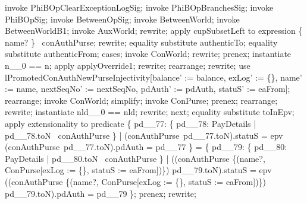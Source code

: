 \begin{LPScript}\begin{zproof}[lPromotedAuxWorldClearExceptionLogType]
    invoke PhiBOpClearExceptionLogSig;
    invoke PhiBOpBranchesSig;
    invoke PhiBOpSig;
    invoke BetweenOpSig;
    invoke BetweenWorld;
    invoke BetweenWorldB1;
    invoke AuxWorld;
    rewrite;
    apply cupSubsetLeft to expression \{ name? \} \cup \dom~conAuthPurse;
    rewrite;
    equality substitute authenticTo;
    equality substitute authenticFrom;
    cases;
        invoke ConWorld;
        rewrite;
        prenex;
        instantiate n\_\_0 == n;
        apply applyOverride1;
        rewrite;
        rearrange;
        rewrite;
        use lPromotedConAuthNewPurseInjectivity[balance' := balance,
            exLog' := \{\}, name' := name, nextSeqNo' := nextSeqNo,
            pdAuth' := pdAuth, statuS' := eaFrom];
        rearrange;
        invoke ConWorld;
        simplify;
        invoke ConPurse;
        prenex;
        rearrange;
        rewrite;
        instantiate nld\_\_0 == nld;
        rewrite;
    next;
        equality substitute toInEpv;
        apply extensionality to predicate
            \{ pd\_\_77: \{ pd\_\_78: PayDetails | pd\_\_78.toN \in \dom~conAuthPurse \}
              | (conAuthPurse~pd\_\_77.toN).statuS = epv
             \land (conAuthPurse~pd\_\_77.toN).pdAuth = pd\_\_77 \}
            = \{ pd\_\_79: \{ pd\_\_80: PayDetails | pd\_\_80.toN \in \dom~conAuthPurse \}
              | ((conAuthPurse \oplus \{(name?, \theta ConPurse[exLog := \{\}, statuS := eaFrom])\})
                    pd\_\_79.toN).statuS = epv
              \land ((conAuthPurse \oplus \{(name?, \theta ConPurse[exLog := \{\},
                    statuS := eaFrom])\}) pd\_\_79.toN).pdAuth = pd\_\_79 \};
        prenex;
        rewrite;

\end{zproof}
\end{LPScript}

